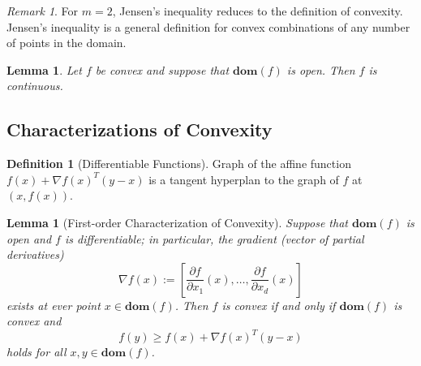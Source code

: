 \documentclass[10pt]{article}
\newcommand{\domain}[1]{\mathbf{dom}(#1)}
\newtheorem{lemma}[theorem]{Lemma}
\theoremstyle{remark}
\newtheorem{remark}[theorem]{Remark}
\theoremstyle{definition}
\newtheorem{definition}[theorem]{Definition}
\begin{document}
\begin{remark}
	For $m=2$, Jensen's inequality reduces to the definition of convexity. Jensen's inequality is 
	a general definition for convex combinations of any number of points in the domain. 
\end{remark}

\begin{lemma}
	Let $f$ be convex and suppose that $\domain{f}$ is open. Then 
	$f$ is continuous.
\end{lemma}

\subsection{Characterizations of Convexity}
\begin{definition}[Differentiable Functions]
	Graph of the affine function $f(x) + \nabla f(x)^T(y-x)$ is a tangent hyperplan 
	to the graph of $f$ at $(x,f(x))$.
\end{definition}

\begin{lemma}[First-order Characterization of Convexity]
	Suppose that $\domain{f}$ is open and $f$ is differentiable; in 
	particular, the gradient (vector of partial derivatives)
	\[ \nabla f(x) := \left[ \frac{\partial f}{\partial x_1}(x), \ldots, \frac{\partial f}{\partial x_d}(x) \right] \]
	exists at ever point $x \in \domain{f}$. Then $f$ is convex if and only if 
	$\domain{f}$ is convex and 
	\begin{equation}
		f(y) \geq f(x) + \nabla f(x)^T(y-x)
	\end{equation}
	holds for all $x,y \in \domain{f}$.
\end{lemma}
\end{document}
